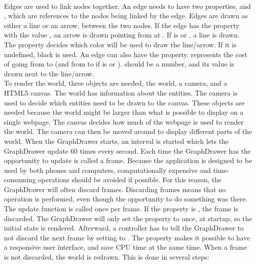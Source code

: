 \\[11pt]
Edges are used to link nodes together. An edge needs to have two properties,  and , which are references to the nodes being linked by the edge. Edges are drawn as either a line or an arrow, between the two nodes. If the edge has the property  with the value , an arrow is drawn pointing from  at . If  is  or , a line is drawn. The  property decides which color will be used to draw the line/arrow. If it is undefined, black is used. An edge can also have the  property.  represents the cost of going from  to  (and from  to  if  is  or ).  should be a number, and its value is drawn next to the line/arrow.
\\[11pt]
To render the world, three objects are needed, the world, a camera, and a HTML5 canvas. The world has information about the entities. The camera is used to decide which entities need to be drawn to the canvas. These objects are needed because the world might be larger than what is possible to display on a single webpage. The canvas decides how much of the webpage is used to render the world. The camera can then be moved around to display different parts of the world. When the GraphDrawer starts, an interval is started which lets the GraphDrawer update 60 times every second. Each time the GraphDrawer has the opportunity to update is called a frame. Because the application is designed to be used by both phones and computers, computationally expensive and time-consuming operations should be avoided if possible. For this reason, the GraphDrawer will often discard frames. Discarding frames means that no operation is performed, even though the opportunity to do something was there. The update function is called once per frame. If the  property is , the frame is discarded. The GraphDrawer will only set the  property to  once, at startup, so the initial state is rendered. Afterward, a controller has to tell the GraphDrawer to not discard the next frame by setting  to . The  property makes it possible to have a responsive user interface, and save CPU time at the same time. When a frame is not discarded, the world is redrawn. This is done in several steps:
